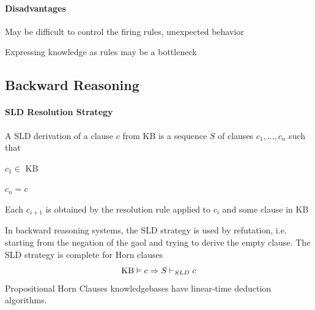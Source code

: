 \documentclass[10pt]{report}
\begin{document}
\paragraph{Disadvantages} \begin{list}{}{}
	\item May be difficult to control the firing rules, unexpected behavior
	\item Expressing knowledge as rules may be a bottleneck
\end{list}
\subsection{Backward Reasoning} 
\paragraph{SLD Resolution Strategy} A SLD derivation of a clause $c$ from KB is a sequence $S$ of clauses $c_1,\ldots,c_n$ such that
\begin{list}{}{}
	\item $c_1 \in$ KB
	\item $c_n = c$
	\item Each $c_{i+1}$ is obtained by the resolution rule applied to $c_i$ and some clause in KB
\end{list}
In backward reasoning systems, the SLD strategy is used by refutation, i.e. starting from the negation of the gaol and trying to derive the empty clause. The SLD strategy is complete for Horn clauses $$\hbox{KB} \vDash c\Rightarrow S \vdash_{SLD} c$$
Propositional Horn Clauses knowledgebases have linear-time deduction algorithms.
\end{document}
